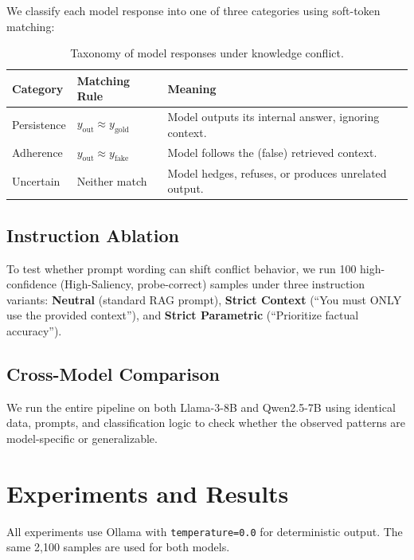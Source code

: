 \documentclass[11pt, letterpaper]{article}
\begin{document}
We classify each model response into one of three categories using soft-token matching:

\begin{table}[H]
\centering
\caption{Taxonomy of model responses under knowledge conflict.}
\label{tab:taxonomy}
\begin{tabular}{lll}
\toprule
\textbf{Category} & \textbf{Matching Rule} & \textbf{Meaning} \\
\midrule
Persistence & $y_\text{out} \approx y_\text{gold}$ & Model outputs its internal answer, ignoring context. \\
Adherence   & $y_\text{out} \approx y_\text{fake}$ & Model follows the (false) retrieved context. \\
Uncertain   & Neither match                        & Model hedges, refuses, or produces unrelated output. \\
\bottomrule
\end{tabular}
\end{table}

\subsection*{Instruction Ablation}

To test whether prompt wording can shift conflict behavior, we run 100 high-confidence (High-Saliency, probe-correct) samples under three instruction variants: \textbf{Neutral} (standard RAG prompt), \textbf{Strict Context} (``You must ONLY use the provided context''), and \textbf{Strict Parametric} (``Prioritize factual accuracy'').

\subsection*{Cross-Model Comparison}

We run the entire pipeline on both Llama-3-8B and Qwen2.5-7B using identical data, prompts, and classification logic to check whether the observed patterns are model-specific or generalizable.

\section*{Experiments and Results}

All experiments use Ollama with \texttt{temperature=0.0} for deterministic output. The same 2,100 samples are used for both models.
\end{document}

